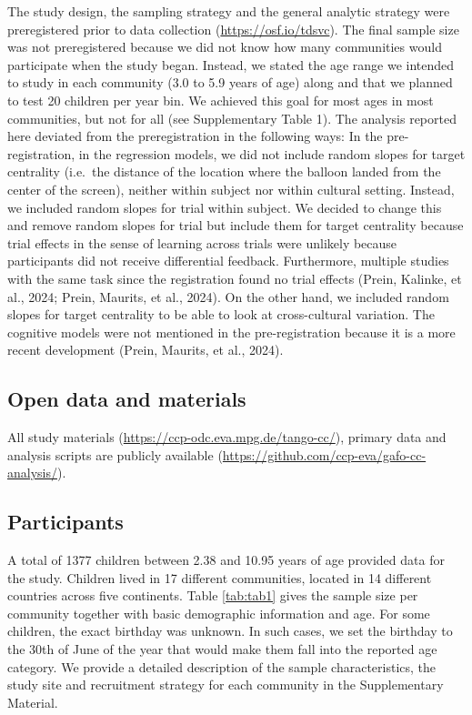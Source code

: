 \documentclass[
  man,floatsintext]{apa7}
\begin{document}
The study design, the sampling strategy and the general analytic strategy were preregistered prior to data collection (\url{https://osf.io/tdsvc}). The final sample size was not preregistered because we did not know how many communities would participate when the study began. Instead, we stated the age range we intended to study in each community (3.0 to 5.9 years of age) along and that we planned to test 20 children per year bin. We achieved this goal for most ages in most communities, but not for all (see Supplementary Table 1). The analysis reported here deviated from the preregistration in the following ways: In the pre-registration, in the regression models, we did not include random slopes for target centrality (i.e.~the distance of the location where the balloon landed from the center of the screen), neither within subject nor within cultural setting. Instead, we included random slopes for trial within subject. We decided to change this and remove random slopes for trial but include them for target centrality because trial effects in the sense of learning across trials were unlikely because participants did not receive differential feedback. Furthermore, multiple studies with the same task since the registration found no trial effects (Prein, Kalinke, et al., 2024; Prein, Maurits, et al., 2024). On the other hand, we included random slopes for target centrality to be able to look at cross-cultural variation. The cognitive models were not mentioned in the pre-registration because it is a more recent development (Prein, Maurits, et al., 2024).

\hypertarget{open-data-and-materials}{%
\subsection{Open data and materials}\label{open-data-and-materials}}

All study materials (\url{https://ccp-odc.eva.mpg.de/tango-cc/}), primary data and analysis scripts are publicly available (\url{https://github.com/ccp-eva/gafo-cc-analysis/}).

\hypertarget{participants}{%
\subsection{Participants}\label{participants}}

A total of 1377 children between 2.38 and 10.95 years of age provided data for the study. Children lived in 17 different communities, located in 14 different countries across five continents. Table \ref{tab:tab1} gives the sample size per community together with basic demographic information and age. For some children, the exact birthday was unknown. In such cases, we set the birthday to the 30th of June of the year that would make them fall into the reported age category. We provide a detailed description of the sample characteristics, the study site and recruitment strategy for each community in the Supplementary Material.
\end{document}
